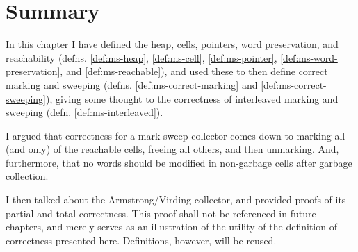 \section{Summary}
\label{sec:marksweep-summary}

In this chapter I have defined the \gls{heap}, \glspl{cell},
\glspl{pointer}, word preservation, and reachability (defns.
\ref{def:ms-heap}, \ref{def:ms-cell}, \ref{def:ms-pointer},
\ref{def:ms-word-preservation}, and \ref{def:ms-reachable}), and used
these to then define correct marking and sweeping (defns.
\ref{def:ms-correct-marking} and \ref{def:ms-correct-sweeping}),
giving some thought to the correctness of interleaved marking and
sweeping (defn. \ref{def:ms-interleaved}).

I argued that correctness for a \gls{mark-sweep} \gls{collector} comes
down to marking all (and only) of the reachable \glspl{cell}, freeing
all others, and then unmarking. And, furthermore, that no words should
be modified in non-\gls{garbage} \glspl{cell} after \gls{garbage
  collection}.

I then talked about the Armstrong/Virding\cite{Armstrong95}
\gls{collector}, and provided proofs of its partial and total
correctness. This proof shall not be referenced in future chapters,
and merely serves as an illustration of the utility of the definition
of correctness presented here. Definitions, however, will be reused.